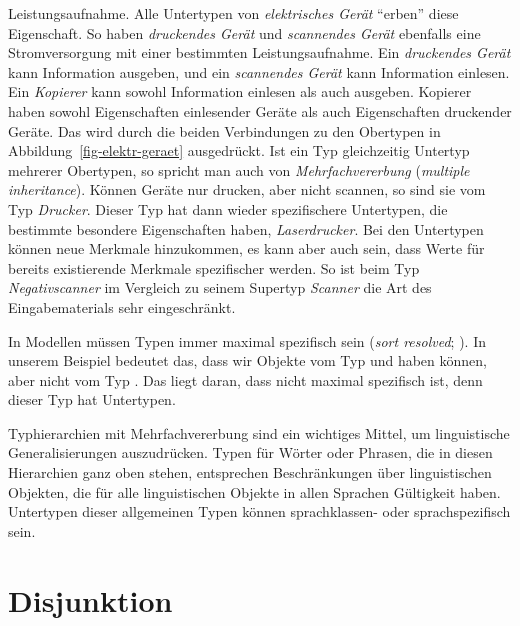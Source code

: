 Leistungsaufnahme. Alle Untertypen von \textit{elektrisches Gerät} "`erben"' diese Eigenschaft. So haben
\zb \textit{druckendes Gerät} und \textit{scannendes Gerät} ebenfalls eine Stromversorgung mit einer
bestimmten Leistungsaufnahme. Ein \textit{druckendes Gerät} kann Information ausgeben, und ein \textit{scannendes Gerät}
kann Information einlesen. Ein \textit{Kopierer} kann sowohl Information einlesen als auch ausgeben.
Kopierer haben sowohl Eigenschaften einlesender Geräte als auch Eigenschaften druckender Geräte. Das wird
durch die beiden Verbindungen zu den Obertypen in Abbildung~\ref{fig-elektr-geraet} ausgedrückt.
Ist ein Typ gleichzeitig Untertyp mehrerer Obertypen, so spricht man auch von \emph{Mehrfachvererbung}
(\emph{multiple inheritance}). Können Geräte nur drucken, aber nicht scannen, so sind sie vom Typ
\emph{Drucker}. Dieser Typ hat dann wieder spezifischere Untertypen, die bestimmte besondere Eigenschaften
haben, \zb \textit{Laserdrucker}. Bei den Untertypen können neue Merkmale hinzukommen, es kann aber
auch sein, dass Werte für bereits existierende Merkmale spezifischer werden. So ist \zb beim
Typ \textit{Negativscanner} im Vergleich zu seinem Supertyp \textit{Scanner} 
die Art des Eingabematerials sehr eingeschränkt. 

In Modellen müssen Typen immer maximal spezifisch sein (\emph{sort resolved}; \cites[18]{ps2}[102]{Richter2024a}). In unserem Beispiel
bedeutet das, dass wir Objekte vom Typ  und  haben können, aber nicht
vom Typ . Das liegt daran, dass  nicht maximal
spezifisch ist, denn dieser Typ hat Untertypen.

Typhierarchien mit Mehrfachvererbung sind ein wichtiges Mittel, um linguistische Generalisierungen
auszudrücken. Typen für Wörter oder Phrasen, die in diesen Hierarchien ganz oben stehen, entsprechen
Beschränkungen über linguistischen Objekten, die für alle linguistischen Objekte in allen Sprachen
Gültigkeit haben. Untertypen dieser allgemeinen Typen können sprachklassen- oder sprachspezifisch sein.%
\largerpage

\section{Disjunktion}

